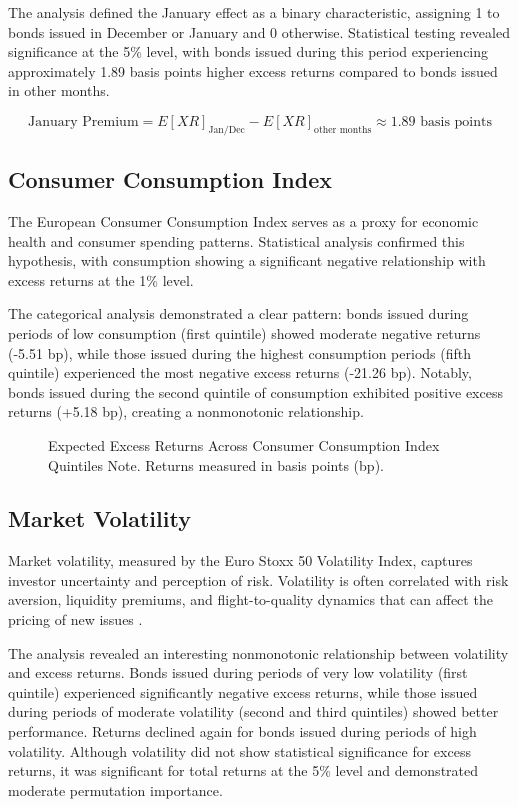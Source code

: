 The analysis defined the January effect as a binary characteristic, assigning 1 to bonds issued in December or January and 0 otherwise. Statistical testing revealed significance at the 5\% level, with bonds issued during this period experiencing approximately 1.89 basis points higher excess returns compared to bonds issued in other months.

$$\text{January Premium} = E[XR]_{\text{Jan/Dec}} - E[XR]_{\text{other months}} \approx 1.89 \text{ basis points}$$

\subsection{Consumer Consumption Index}

The European Consumer Consumption Index serves as a proxy for economic health and consumer spending patterns. Statistical analysis confirmed this hypothesis, with consumption showing a significant negative relationship with excess returns at the 1\% level.

The categorical analysis demonstrated a clear pattern: bonds issued during periods of low consumption (first quintile) showed moderate negative returns (-5.51 bp), while those issued during the highest consumption periods (fifth quintile) experienced the most negative excess returns (-21.26 bp). Notably, bonds issued during the second quintile of consumption exhibited positive excess returns (+5.18 bp), creating a nonmonotonic relationship.

\begin{figure}[h]
    \begin{center}
        
    \end{center}
    \caption{Expected Excess Returns Across Consumer Consumption Index Quintiles Note. Returns measured in basis points (bp).}
    \label{fig:consumption}
\end{figure}

\subsection{Market Volatility}
Market volatility, measured by the Euro Stoxx 50 Volatility Index, captures investor uncertainty and perception of risk. Volatility is often correlated with risk aversion, liquidity premiums, and flight-to-quality dynamics that can affect the pricing of new issues \parencite{Thank2004FlightRisk}.

The analysis revealed an interesting nonmonotonic relationship between volatility and excess returns. Bonds issued during periods of very low volatility (first quintile) experienced significantly negative excess returns, while those issued during periods of moderate volatility (second and third quintiles) showed better performance. Returns declined again for bonds issued during periods of high volatility. Although volatility did not show statistical significance for excess returns, it was significant for total returns at the 5\% level and demonstrated moderate permutation importance.

